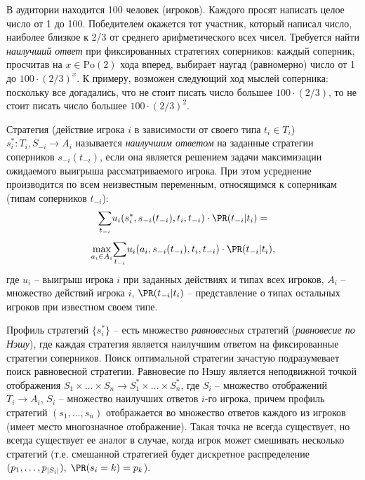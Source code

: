 \begin{problem}
В аудитории находится 100 человек (игроков). Каждого просят написать целое число от 1 до 100. Победителем окажется тот участник, который написал число, наиболее близкое к 2/3 от среднего арифметического всех чисел. Требуется найти  \textit{наилучший ответ} при фиксированных стратегиях соперников: каждый соперник, просчитав на $x \in \mathrm{Po}(2)$  хода  вперед, выбирает наугад (равномерно) число от 1 до $100 \cdot(2/3)^x$. К примеру, возможен следующий ход мыслей соперника: поскольку все догадались, что не стоит писать число большее $100 \cdot(2/3)$, то не стоит писать число большее $100 \cdot(2/3)^2$.
\end{problem}

\begin{remark}
Стратегия (действие игрока $i$ в зависимости от своего типа $t_i \in T_i$) $s_i^*: T_i, S_{-i} \rightarrow A_i$ называется \textit{наилучшим ответом} на заданные стратегии соперников $s_{-i}(t_{-i})$, если она является решением задачи максимизации ожидаемого выигрыша рассматриваемого игрока. При этом усреднение производится по всем неизвестным переменным, относящимся к соперникам (типам соперников $t_{-i}$): 
 \[
 \underset{t_{-i}}{\sum} u_i(s_i^*, s_{-i}(t_{-i}), t_i, t_{-i}) \cdot  \PR(t_{-i} | t_i) = \]\[ \underset{a_i \in A_i}{\max} \underset{t_{-i}}{\sum} u_i(a_i, s_{-i}(t_{-i}), t_i, t_{-i}) \cdot \PR(t_{-i} | t_i), 
 \]
 \noindent где $u_i$ -- выигрыш игрока $i$  при заданных действиях и типах всех игроков, $A_i$ -- множество действий игрока $i$, $\PR(t_{-i} | t_i)$ -- представление о типах остальных игроков при известном своем типе. 
 
Профиль стратегий $\{s_i^*\}$ -- есть множество \textit{равновесных} стратегий (\textit{равновесие по Нэшу}), где каждая стратегия является наилучшим ответом на фиксированные стратегии соперников. Поиск оптимальной стратегии зачастую подразумевает поиск равновесной стратегии. Равновесие по Нэшу является неподвижной точкой отображения $S_1 \times \ldots \times S_n \rightarrow S_1^* \times \ldots \times S_n^*$, где $S_i$ -- множество отображений $T_i \rightarrow A_i$, $S_i$ -- множество наилучших ответов $i$-го игрока, причем профиль стратегий $(s_1, \ldots, s_n)$ отображается во множество ответов каждого из игроков (имеет место многозначное отображение). Такая точка не всегда существует, но всегда существует ее аналог в случае, когда игрок может смешивать несколько стратегий (т.е. смешанной стратегией будет дискретное распределение $(p_1,\ldots,p_{|S_i|}),\; \PR(s_i = k) = p_k$).     
\end{remark}

